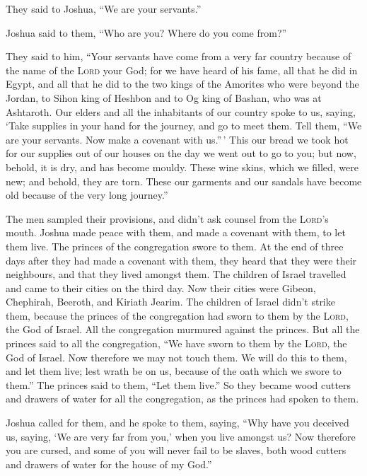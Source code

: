  They said to Joshua, ``We are your servants.''

Joshua said to them, ``Who are you? Where do you come from?''

 They said to him, ``Your servants have come from a very
far country because of the name of the \textsc{Lord} your God; for we
have heard of his fame, all that he did in Egypt,  and
all that he did to the two kings of the Amorites who were beyond the
Jordan, to Sihon king of Heshbon and to Og king of Bashan, who was at
Ashtaroth.  Our elders and all the inhabitants of our
country spoke to us, saying, `Take supplies in your hand for the
journey, and go to meet them. Tell them, ``We are your servants. Now
make a covenant with us.''\,'  This our bread we took hot
for our supplies out of our houses on the day we went out to go to you;
but now, behold, it is dry, and has become mouldy.  These
wine skins, which we filled, were new; and behold, they are torn. These
our garments and our sandals have become old because of the very long
journey.''

 The men sampled their provisions, and didn't ask counsel
from the \textsc{Lord}'s mouth.  Joshua made peace with
them, and made a covenant with them, to let them live. The princes of
the congregation swore to them.  At the end of three days
after they had made a covenant with them, they heard that they were
their neighbours, and that they lived amongst them.  The
children of Israel travelled and came to their cities on the third day.
Now their cities were Gibeon, Chephirah, Beeroth, and Kiriath Jearim.
 The children of Israel didn't strike them, because the
princes of the congregation had sworn to them by the \textsc{Lord}, the
God of Israel. All the congregation murmured against the princes.
 But all the princes said to all the congregation, ``We
have sworn to them by the \textsc{Lord}, the God of Israel. Now
therefore we may not touch them.  We will do this to
them, and let them live; lest wrath be on us, because of the oath which
we swore to them.''  The princes said to them, ``Let them
live.'' So they became wood cutters and drawers of water for all the
congregation, as the princes had spoken to them.

 Joshua called for them, and he spoke to them, saying,
``Why have you deceived us, saying, `We are very far from you,' when you
live amongst us?  Now therefore you are cursed, and some
of you will never fail to be slaves, both wood cutters and drawers of
water for the house of my God.''

